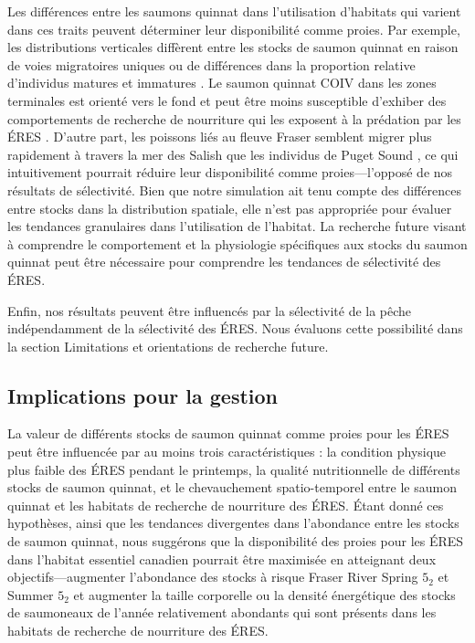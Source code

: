 Les différences entre les saumons quinnat dans l'utilisation d'habitats qui varient dans ces traits peuvent déterminer leur disponibilité comme proies. Par exemple, les distributions verticales diffèrent entre les stocks de saumon quinnat en raison de voies migratoires uniques ou de différences dans la proportion relative d'individus matures et immatures \citep{freshwaterChinookSalmonDepth2024}. Le saumon quinnat COIV dans les zones terminales est orienté vers le fond et peut être moins susceptible d'exhiber des comportements de recherche de nourriture qui les exposent à la prédation par les ÉRES \citep[p. ex.,][]{waltersRecruitmentLimitationConsequence1993}. D'autre part, les poissons liés au fleuve Fraser semblent migrer plus rapidement à travers la mer des Salish que les individus de Puget Sound \citep{hendriksBehaviourMovementReturn2024}, ce qui intuitivement pourrait réduire leur disponibilité comme proies---l'opposé de nos résultats de sélectivité. Bien que notre simulation ait tenu compte des différences entre stocks dans la distribution spatiale, elle n'est pas appropriée pour évaluer les tendances granulaires dans l'utilisation de l'habitat. La recherche future visant à comprendre le comportement et la physiologie spécifiques aux stocks du saumon quinnat peut être nécessaire pour comprendre les tendances de sélectivité des ÉRES.

Enfin, nos résultats peuvent être influencés par la sélectivité de la pêche indépendamment de la sélectivité des ÉRES. Nous évaluons cette possibilité dans la section Limitations et orientations de recherche future.

\subsection{Implications pour la gestion}

La valeur de différents stocks de saumon quinnat comme proies pour les ÉRES peut être influencée par au moins trois caractéristiques : la condition physique plus faible des ÉRES pendant le printemps, la qualité nutritionnelle de différents stocks de saumon quinnat, et le chevauchement spatio-temporel entre le saumon quinnat et les habitats de recherche de nourriture des ÉRES. Étant donné ces hypothèses, ainsi que les tendances divergentes dans l'abondance entre les stocks de saumon quinnat, nous suggérons que la disponibilité des proies pour les ÉRES dans l'habitat essentiel canadien pourrait être maximisée en atteignant deux objectifs---augmenter l'abondance des stocks à risque Fraser River Spring $5_2$ et Summer $5_2$ et augmenter la taille corporelle ou la densité énergétique des stocks de saumoneaux de l'année relativement abondants qui sont présents dans les habitats de recherche de nourriture des ÉRES.

